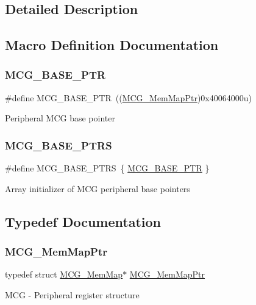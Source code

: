 \subsection{Detailed Description}


\subsection{Macro Definition Documentation}
\mbox{\label{group___m_c_g___peripheral_gaceefc72e93a47a35f59a31c57dddf41b}} 
\subsubsection{\texorpdfstring{M\+C\+G\+\_\+\+B\+A\+S\+E\+\_\+\+P\+TR}{MCG\_BASE\_PTR}}
{\footnotesize\ttfamily \#define M\+C\+G\+\_\+\+B\+A\+S\+E\+\_\+\+P\+TR~((\hyperlink{group___m_c_g___peripheral_ga1cb93dd00863c129e7753ec45a7c3563}{M\+C\+G\+\_\+\+Mem\+Map\+Ptr})0x40064000u)}

Peripheral M\+CG base pointer \mbox{\label{group___m_c_g___peripheral_ga3e6aec328b7327acc1f7bff70bec388c}} 
\subsubsection{\texorpdfstring{M\+C\+G\+\_\+\+B\+A\+S\+E\+\_\+\+P\+T\+RS}{MCG\_BASE\_PTRS}}
{\footnotesize\ttfamily \#define M\+C\+G\+\_\+\+B\+A\+S\+E\+\_\+\+P\+T\+RS~\{ \hyperlink{group___m_c_g___peripheral_gaceefc72e93a47a35f59a31c57dddf41b}{M\+C\+G\+\_\+\+B\+A\+S\+E\+\_\+\+P\+TR} \}}

Array initializer of M\+CG peripheral base pointers 

\subsection{Typedef Documentation}
\mbox{\label{group___m_c_g___peripheral_ga1cb93dd00863c129e7753ec45a7c3563}} 
\subsubsection{\texorpdfstring{M\+C\+G\+\_\+\+Mem\+Map\+Ptr}{MCG\_MemMapPtr}}
{\footnotesize\ttfamily typedef struct \hyperlink{struct_m_c_g___mem_map}{M\+C\+G\+\_\+\+Mem\+Map}$\ast$ \hyperlink{group___m_c_g___peripheral_ga1cb93dd00863c129e7753ec45a7c3563}{M\+C\+G\+\_\+\+Mem\+Map\+Ptr}}

M\+CG -\/ Peripheral register structure 